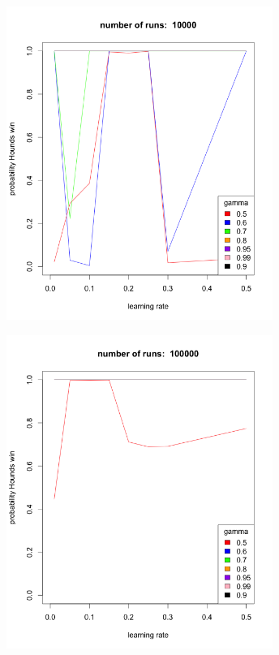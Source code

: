 \documentclass{beamer}
\begin{document}
\begin{frame}
    \centering
    \includegraphics[width=0.65\textwidth]{r10000.png}
\end{frame}

\begin{frame}
    \centering
    \includegraphics[width=0.65\textwidth]{r100000.png}
\end{frame}


\end{document}
